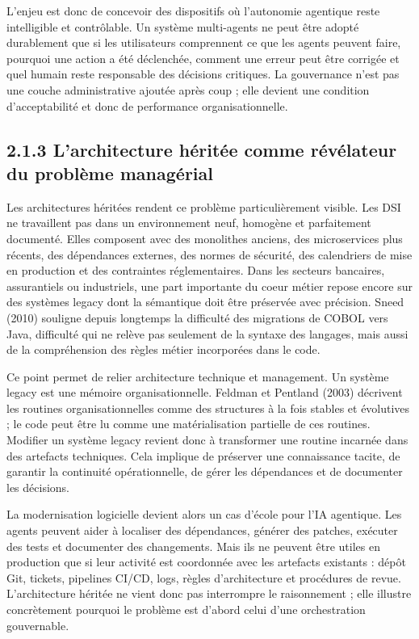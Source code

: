 L'enjeu est donc de concevoir des dispositifs où l'autonomie agentique reste intelligible et contrôlable. Un système multi-agents ne peut être adopté durablement que si les utilisateurs comprennent ce que les agents peuvent faire, pourquoi une action a été déclenchée, comment une erreur peut être corrigée et quel humain reste responsable des décisions critiques. La gouvernance n'est pas une couche administrative ajoutée après coup ; elle devient une condition d'acceptabilité et donc de performance organisationnelle.

\subsection{2.1.3 L'architecture héritée comme révélateur du problème managérial}\label{larchitecture-huxe9rituxe9e-comme-ruxe9vuxe9lateur-du-probluxe8me-managuxe9rial}

Les architectures héritées rendent ce problème particulièrement visible. Les DSI ne travaillent pas dans un environnement neuf, homogène et parfaitement documenté. Elles composent avec des monolithes anciens, des microservices plus récents, des dépendances externes, des normes de sécurité, des calendriers de mise en production et des contraintes réglementaires. Dans les secteurs bancaires, assurantiels ou industriels, une part importante du coeur métier repose encore sur des systèmes legacy dont la sémantique doit être préservée avec précision. Sneed (2010) souligne depuis longtemps la difficulté des migrations de COBOL vers Java, difficulté qui ne relève pas seulement de la syntaxe des langages, mais aussi de la compréhension des règles métier incorporées dans le code.

Ce point permet de relier architecture technique et management. Un système legacy est une mémoire organisationnelle. Feldman et Pentland (2003) décrivent les routines organisationnelles comme des structures à la fois stables et évolutives ; le code peut être lu comme une matérialisation partielle de ces routines. Modifier un système legacy revient donc à transformer une routine incarnée dans des artefacts techniques. Cela implique de préserver une connaissance tacite, de garantir la continuité opérationnelle, de gérer les dépendances et de documenter les décisions.

La modernisation logicielle devient alors un cas d'école pour l'IA agentique. Les agents peuvent aider à localiser des dépendances, générer des patches, exécuter des tests et documenter des changements. Mais ils ne peuvent être utiles en production que si leur activité est coordonnée avec les artefacts existants : dépôt Git, tickets, pipelines CI/CD, logs, règles d'architecture et procédures de revue. L'architecture héritée ne vient donc pas interrompre le raisonnement ; elle illustre concrètement pourquoi le problème est d'abord celui d'une orchestration gouvernable.

